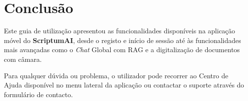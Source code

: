 \chapter{Conclusão}

Este guia de utilização apresentou as funcionalidades disponíveis na aplicação móvel do \textbf{ScriptumAI}, desde o registo e início de sessão até às funcionalidades mais avançadas como o \textit{Chat} Global com RAG e a digitalização de documentos com câmara.

Para qualquer dúvida ou problema, o utilizador pode recorrer ao Centro de Ajuda disponível no menu lateral da aplicação ou contactar o suporte através do formulário de contacto.
